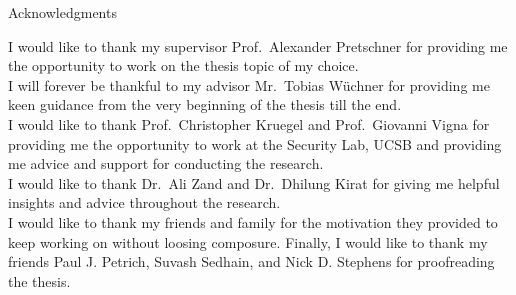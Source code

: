 \thispagestyle{empty}

\vspace*{2cm}

\begin{center}
{ Acknowledgments}
\end{center}

\vspace{1cm}

I would like to thank my supervisor Prof.\ Alexander Pretschner for providing me the opportunity to work on the thesis topic of my choice.\\
I will forever be thankful to my advisor Mr.\ Tobias Wüchner for providing me keen guidance from the very beginning of the thesis till the end.\\

I would like to thank Prof.\ Christopher Kruegel and Prof.\ Giovanni Vigna for providing me the opportunity to work at the Security Lab, UCSB and providing me advice and support for conducting the research.\\
I would like to thank Dr.\ Ali Zand and Dr.\ Dhilung Kirat for giving me helpful insights and advice throughout the research.\\

I would like to thank my friends and family for the motivation they provided to keep working on without loosing composure.
Finally, I would like to thank my friends Paul J. Petrich, Suvash Sedhain, and Nick D. Stephens for proofreading the thesis.

\cleardoublepage{}
